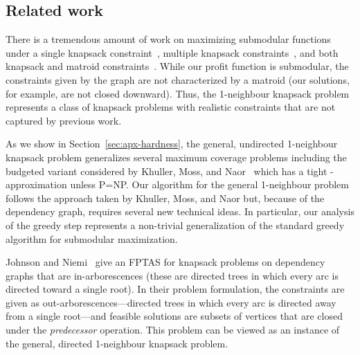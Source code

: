 \documentclass[12pt]{article}
\begin{document}
\subsection{Related work} \label{sec:related}

There is a tremendous amount of work on maximizing submodular functions under a single knapsack constraint~\cite{Sviridenko:orl2004}, multiple knapsack constraints~\cite{Kulik:2009}, and both knapsack and matroid constraints~\cite{Lee:2009,groundan-schulz:prepreint2009}.  While our profit function is submodular, the constraints given by the graph are not characterized by a matroid (our solutions, for example, are not closed downward).  Thus, the 1-neighbour knapsack problem represents a class of knapsack problems with realistic constraints that are not captured by previous work.

As we show in Section~\ref{sec:apx-hardness}, the general, undirected 1-neighbour knapsack problem generalizes several maximum coverage problems including the budgeted variant considered by Khuller, Moss, and Naor~\cite{kmn:ipl1999} which has a tight -approximation unless P=NP.  Our algorithm for the general 1-neighbour problem follows the approach taken by Khuller, Moss, and Naor but, because of the dependency graph, requires several new technical ideas.  In particular, our analysis of the greedy step represents a non-trivial generalization of the standard greedy algorithm for submodular maximization.



























Johnson and Niemi~\cite{Johnson:1983p1256} give an FPTAS for knapsack
problems on dependency graphs that are in-arborescences (these are
directed trees in which every arc is directed toward a single root).
In their problem formulation, the constraints are given as
out-arborescences---directed trees in which every arc is directed away
from a single root---and feasible solutions are subsets of vertices
that are closed under the {\em predecessor} operation. This problem
can be viewed as an instance of the general, directed 1-neighbour
knapsack problem.
\end{document}
